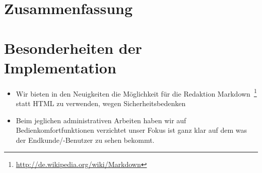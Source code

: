 \documentclass[12pt,a4paper,oneside,ngerman]{article}
\begin{document}
\section{Zusammenfassung} %

\section{Besonderheiten der Implementation}

\begin{itemize}
	\item Wir bieten in den Neuigkeiten die Möglichkeit für die Redaktion Markdown~\footnote{\url{http://de.wikipedia.org/wiki/Markdown}} statt HTML zu verwenden, wegen Sicherheitsbedenken
	\item Beim jeglichen administrativen Arbeiten haben wir auf Bedienkomfortfunktionen verzichtet unser Fokus ist ganz klar auf dem was der Endkunde/-Benutzer zu sehen bekommt.
	
\end{itemize}
\end{document}
